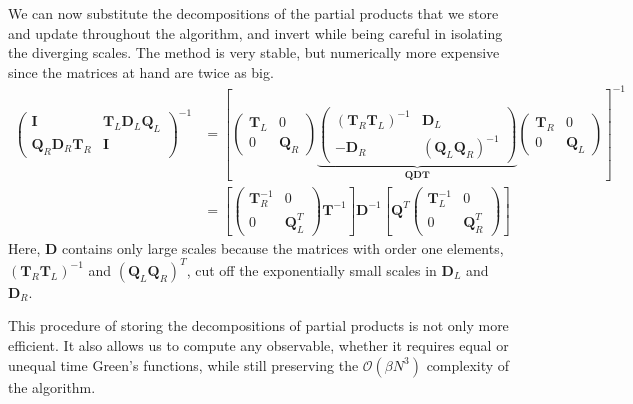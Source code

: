 We can now substitute the decompositions of the partial products that we store and update throughout the algorithm, and invert while being careful in isolating the diverging scales.
The method is very stable, but numerically more expensive since the matrices at hand are twice as big.
\begin{equation}
\begin{split}
\begin{pmatrix}
\bm I & \bm T_L \bm D_L \bm Q_L \\
\bm Q_R \bm D_R \bm T_R & \bm I
\end{pmatrix}^{-1}
&= \left[
\begin{pmatrix}
\bm T_L & 0 \\
0 & \bm Q_R 
\end{pmatrix}
\underbrace{\begin{pmatrix}
(\bm T_R \bm T_L)^{-1} & \bm D_L \\
- \bm D_R & (\bm Q_L \bm Q_R)^{-1}
\end{pmatrix}}_{\bm Q \bm D \bm T}
\begin{pmatrix}
\bm T_R & 0 \\
0 & \bm Q_L
\end{pmatrix}
\right]^{-1} \\
&= \left[
\begin{pmatrix}
\bm T_R^{-1} & 0 \\
0 & \bm Q_L^T
\end{pmatrix}
\bm T^{-1} \right]
\bm D^{-1}
\left[
\bm Q^T
\begin{pmatrix}
\bm T_L^{-1} & 0 \\
0 & \bm Q_R^T
\end{pmatrix}
\right]
\end{split}
\end{equation}
Here, $\bm D$ contains only large scales because the matrices with order one elements, $(\bm T_R \bm T_L)^{-1}$ and $(\bm Q_L \bm Q_R)^T$, cut off the exponentially small scales in $\bm D_L$ and $\bm D_R$.

This procedure of storing the decompositions of partial products is not only more efficient.
It also allows us to compute any observable, whether it requires equal or unequal time Green's functions, while still preserving the $\mathcal{O} (\beta N^3 )$ complexity of the algorithm.